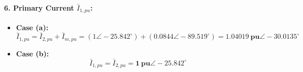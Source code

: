 \paragraph{6. Primary Current $\bar{I}_{1,pu}$:}
\begin{itemize}
    \item \textbf{Case (a):}
    \begin{equation}
        \bar{I}_{1,pu} = \bar{I}_{2,pu} + \bar{I}_{m,pu} = (1\angle -25.842^\circ) + (0.0844\angle -89.519^\circ) = \mathbf{1.04019\ \text{pu} \angle -30.0135^\circ}
    \end{equation}
    \item \textbf{Case (b):}
    \begin{equation}
        \bar{I}_{1,pu} = \bar{I}_{2,pu} = \mathbf{1\ \text{pu} \angle -25.842^\circ}
    \end{equation}
\end{itemize}

